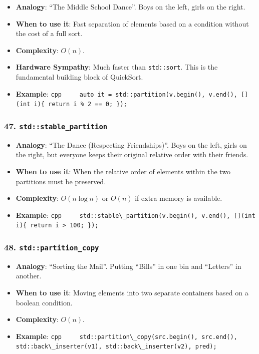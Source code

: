 \begin{itemize}
\tightlist
\item
  \textbf{Analogy}: ``The Middle School Dance''. Boys on the left, girls
  on the right.
\item
  \textbf{When to use it}: Fast separation of elements based on a
  condition without the cost of a full sort.
\item
  \textbf{Complexity}: \(O(n)\).
\item
  \textbf{Hardware Sympathy}: Much faster than
  \passthrough{\lstinline!std::sort!}. This is the fundamental building
  block of QuickSort.
\item
  \textbf{Example}:
  \passthrough{\lstinline!cpp     auto it = std::partition(v.begin(), v.end(), [](int i)\{ return i \% 2 == 0; \});!}
\end{itemize}

\hypertarget{stdstable_partition}{%
\subsubsection{\texorpdfstring{47.
\texttt{std::stable\_partition}}{47. std::stable\_partition}}\label{stdstable_partition}}

\begin{itemize}
\tightlist
\item
  \textbf{Analogy}: ``The Dance (Respecting Friendships)''. Boys on the
  left, girls on the right, but everyone keeps their original relative
  order with their friends.
\item
  \textbf{When to use it}: When the relative order of elements within
  the two partitions must be preserved.
\item
  \textbf{Complexity}: \(O(n \log n)\) or \(O(n)\) if extra memory is
  available.
\item
  \textbf{Example}:
  \passthrough{\lstinline!cpp     std::stable\_partition(v.begin(), v.end(), [](int i)\{ return i > 100; \});!}
\end{itemize}

\hypertarget{stdpartition_copy}{%
\subsubsection{\texorpdfstring{48.
\texttt{std::partition\_copy}}{48. std::partition\_copy}}\label{stdpartition_copy}}

\begin{itemize}
\tightlist
\item
  \textbf{Analogy}: ``Sorting the Mail''. Putting ``Bills'' in one bin
  and ``Letters'' in another.
\item
  \textbf{When to use it}: Moving elements into two separate containers
  based on a boolean condition.
\item
  \textbf{Complexity}: \(O(n)\).
\item
  \textbf{Example}:
  \passthrough{\lstinline!cpp     std::partition\_copy(src.begin(), src.end(), std::back\_inserter(v1), std::back\_inserter(v2), pred);!}
\end{itemize}

